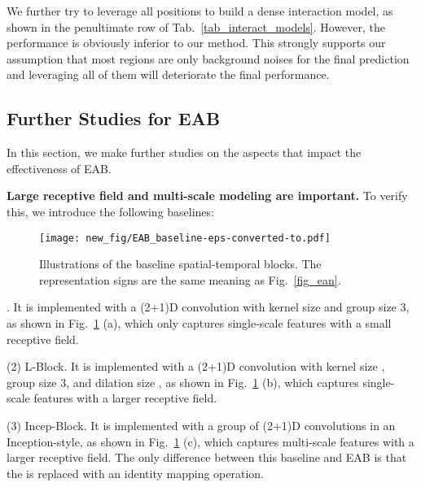  We further try to leverage all positions to build a dense interaction model, as shown in the penultimate row of Tab.~\ref{tab_interact_models}. However, the performance is obviously inferior to our method. This strongly supports our assumption that most regions are only background noises for the final prediction and leveraging all of them will deteriorate the final performance.
 




\subsection{Further Studies for EAB}\label{sec_eab}
In this section, we make further studies on the aspects that impact the effectiveness of EAB.

\textbf{Large receptive field and multi-scale modeling are important.}
To verify this, we introduce the following baselines: 

\begin{figure}[!htb]
	\centering
	\begin{minipage}[b]{0.9\linewidth}
		\centering
		\centerline{\texttt{[image: new\_fig/EAB\_baseline-eps-converted-to.pdf]}}
	\end{minipage}
	\caption {Illustrations of the baseline spatial-temporal blocks.
		The representation signs are the same meaning as Fig.~\ref{fig_ean}.
	}
\spacebelowtab
	\label{fig_base_arch}
\end{figure}



	.
	It is implemented with a (2+1)D convolution with kernel size  and group size 3, as shown in Fig.~\ref{fig_base_arch} (a), which only captures single-scale features with a small receptive field.
	
	\noindent \textsf{\small (2) L-Block}.
	It is implemented with a (2+1)D convolution with kernel size , group size 3, and dilation size , as shown in Fig.~\ref{fig_base_arch} (b), which captures single-scale features with a larger receptive field.
	
	\noindent \textsf{\small (3) Incep-Block}.
	It is implemented with a group of (2+1)D convolutions in an Inception-style, as shown in Fig.~\ref{fig_base_arch} (c), which captures multi-scale features with a larger receptive field.
	 The only difference between this baseline and EAB is that the  is replaced with an identity mapping operation.







